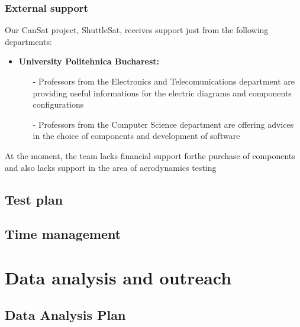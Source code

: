 \documentclass[11pt]{article}
\begin{document}
\subsubsection{External support}
Our CanSat project, ShuttleSat, receives support just from the following departments:
\begin{itemize}
\item \textbf{University Politehnica Bucharest:} 
\begin{itemize}
\item[-] Professors from the Electronics and Telecomunications department are providing useful informations for the electric diagrams and components configurations
\item[-] Professors from the Computer Science department are offering advices in the choice of components and development of software
\end{itemize}
\end{itemize}

At the moment, the team lacks financial support forthe purchase of components and also lacks support in the area of aerodynamics testing

\subsection{Test plan}

\subsection{Time management}




\section{Data analysis and outreach}

\subsection{Data Analysis Plan}
\end{document}
